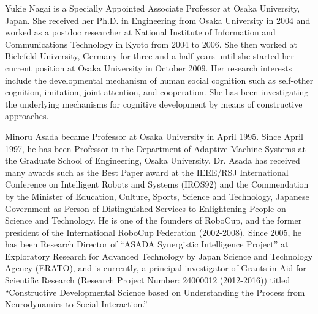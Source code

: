 \documentclass[journal]{IEEEtran}
\begin{document}
\begin{IEEEbiography}{Yukie Nagai}
is a Specially Appointed Associate Professor at Osaka University, Japan. She received her Ph.D. in Engineering from Osaka University in 2004 and worked as a postdoc researcher at National Institute of Information and Communications Technology in Kyoto from 2004 to 2006. She then worked at Bielefeld University, Germany for three and a half years until she started her current position at Osaka University in October 2009. Her research interests include the developmental mechanism of human social cognition such as self-other cognition, imitation, joint attention, and cooperation. She has been investigating the underlying mechanisms for cognitive development by means of constructive approaches.
\end{IEEEbiography}

\begin{IEEEbiography}{Minoru Asada}
became Professor at Osaka University in April 1995. Since April 1997, he has been Professor in the Department of Adaptive Machine Systems at the Graduate School of Engineering, Osaka University. Dr. Asada has received many awards such as the Best Paper award at the IEEE/RSJ International Conference on Intelligent Robots and Systems (IROS92) and the Commendation by the Minister of Education, Culture, Sports, Science and Technology, Japanese Government as Person of Distinguished Services to Enlightening People on Science and Technology. He is one of the founders of RoboCup, and the former president of the International RoboCup Federation (2002-2008). Since 2005, he has been Research Director of “ASADA Synergistic Intelligence Project” at Exploratory Research for Advanced Technology by Japan Science and Technology Agency (ERATO), and is currently, a principal investigator of Grants-in-Aid for Scientific Research (Research Project Number: 24000012 (2012-2016)) titled “Constructive Developmental Science based on Understanding the Process from Neurodynamics to Social Interaction.”
\end{IEEEbiography}
\end{document}
